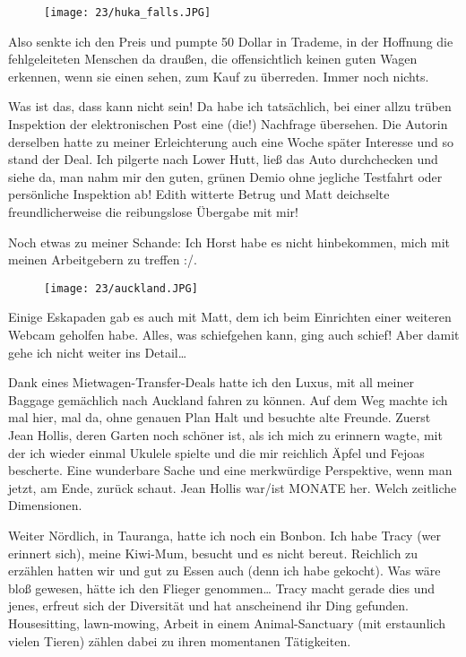 \begin{figure}[h]
  \centering
  \texttt{[image: 23/huka\_falls.JPG]}
\end{figure}
Also senkte ich den Preis und pumpte 50 Dollar in Trademe, in der
Hoffnung die fehlgeleiteten Menschen da draußen, die offensichtlich
keinen guten Wagen erkennen, wenn sie einen sehen, zum Kauf zu
überreden. Immer noch nichts.

Was ist das, dass kann nicht sein! Da habe ich tatsächlich, bei einer
allzu trüben Inspektion der elektronischen Post eine (die!) Nachfrage
übersehen. Die Autorin derselben hatte zu meiner Erleichterung auch
eine Woche später Interesse und so stand der Deal. Ich pilgerte nach
Lower Hutt, ließ das Auto durchchecken und siehe da, man nahm mir den
guten, grünen Demio ohne jegliche Testfahrt oder persönliche
Inspektion ab! Edith witterte Betrug und Matt deichselte
freundlicherweise die reibungslose Übergabe mit mir!

Noch etwas zu meiner Schande: Ich Horst habe es nicht hinbekommen, mich
mit meinen Arbeitgebern zu treffen :/.


\begin{figure}[h]
  \centering
  \texttt{[image: 23/auckland.JPG]}
\end{figure}
Einige Eskapaden gab es auch mit Matt, dem ich beim Einrichten einer
weiteren Webcam geholfen habe. Alles, was schiefgehen kann, ging auch
schief! Aber damit gehe ich nicht weiter ins Detail\ldots{}

Dank eines Mietwagen-Transfer-Deals hatte ich den Luxus, mit all meiner
Baggage gemächlich nach Auckland fahren zu können. Auf dem Weg machte
ich mal hier, mal da, ohne genauen Plan Halt und besuchte alte Freunde.
Zuerst Jean Hollis, deren Garten noch schöner ist, als ich mich zu
erinnern wagte, mit der ich wieder einmal Ukulele spielte und die mir
reichlich Äpfel und Fejoas bescherte. Eine wunderbare Sache und eine
merkwürdige Perspektive, wenn man jetzt, am Ende, zurück schaut. Jean
Hollis war/ist MONATE her. Welch zeitliche Dimensionen.

Weiter Nördlich, in Tauranga, hatte ich noch ein Bonbon. Ich habe Tracy
(wer erinnert sich), meine Kiwi-Mum, besucht und es nicht bereut.
Reichlich zu erzählen hatten wir und gut zu Essen auch (denn ich habe
gekocht). Was wäre bloß gewesen, hätte ich den Flieger genommen\ldots{}
Tracy macht gerade dies und jenes, erfreut sich der Diversität und hat
anscheinend ihr Ding gefunden. Housesitting, lawn-mowing, Arbeit in
einem Animal-Sanctuary (mit erstaunlich vielen Tieren) zählen dabei zu
ihren momentanen Tätigkeiten.



